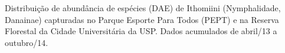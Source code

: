 \label{fig:2.1.2} Distribuição de abundância de espécies (DAE) de Ithomiini (Nymphalidade, Danainae) capturadas no Parque Esporte Para Todos (PEPT) e na Reserva Florestal da Cidade Universitária da USP. Dados acumulados de abril/13 a outubro/14.




